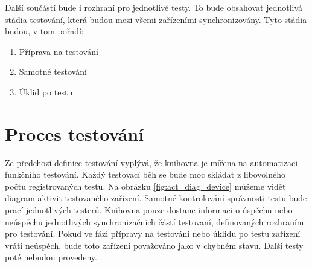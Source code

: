 Další součástí bude i rozhraní pro jednotlivé testy. To bude obsahovat jednotlivá stádia testování, která budou mezi všemi zařízeními synchronizovány. Tyto stádia budou, v tom pořadí:
\begin{enumerate}
    \item Příprava na testování
    \item Samotné testování
    \item Úklid po testu
\end{enumerate}

\section{Proces testování}

Ze předchozí definice testování vyplývá, že knihovna je mířena na automatizaci funkčního testování. Každý testovací běh se bude moc skládat z libovolného počtu registrovaných testů. Na obrázku \ref{fig:act_diag_device} můžeme vidět diagram aktivit testovaného zařízení. Samotné kontrolování správnosti testu bude prací jednotlivých testerů. Knihovna pouze dostane informaci o úspěchu nebo neúspěchu jednotlivých synchronizačních částí testovaní, definovaných rozhraním pro testování. Pokud ve fázi přípravy na testování nebo úklidu po testu zařízení vrátí neúspěch, bude toto zařízení považováno jako v chybném stavu. Další testy poté nebudou provedeny. 

